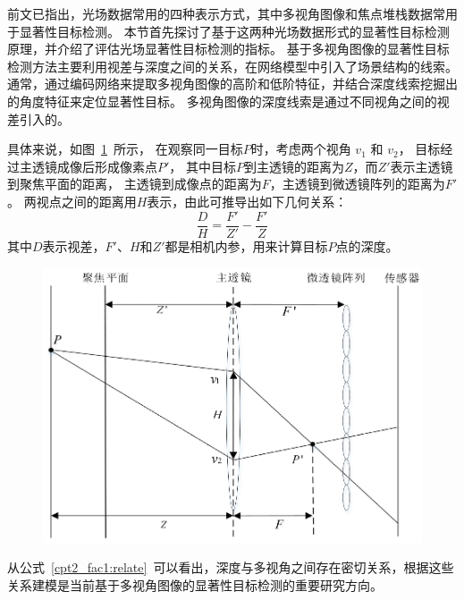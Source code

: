 %
%
%
%
%
%
%
%
%
%
%
%
前文已指出，光场数据常用的四种表示方式，其中多视角图像和焦点堆栈数据常用于显著性目标检测。
本节首先探讨了基于这两种光场数据形式的显著性目标检测原理，并介绍了评估光场显著性目标检测的指标。
%
%
%
%
%
%
基于多视角图像的显著性目标检测方法主要利用视差与深度之间的关系，在网络模型中引入了场景结构的线索。
通常，通过编码网络来提取多视角图像的高阶和低阶特征，并结合深度线索挖掘出的角度特征来定位显著性目标。
多视角图像的深度线索是通过不同视角之间的视差引入的。

具体来说，如图~\ref{cpt2_fig8:multi_array}~所示，
在观察同一目标$P$时，考虑两个视角 $v_{1}$ 和 $v_{2}$，
目标经过主透镜成像后形成像素点$P'$，
其中目标$P$到主透镜的距离为$Z$，而$Z'$表示主透镜到聚焦平面的距离，
主透镜到成像点的距离为$F$，主透镜到微透镜阵列的距离为$F'$。
两视点之间的距离用$H$表示，由此可推导出如下几何关系：
%
%
\begin{equation}
	\frac{D}{H} = \frac{F'}{Z'} - \frac{F'}{Z} 
	\label{cpt2_fac1:relate}
\end{equation}
%
%
其中$D$表示视差，$F'$、$H$和$Z'$都是相机内参，用来计算目标$P$点的深度。\par
%
%
\begin{figure}[!ht]
	\centering
	\includegraphics[width=0.80\linewidth]{figures/chapter2/multi_array}
	\label{cpt2_fig8:multi_array}
\end{figure}
%
%
%
%
从公式~\ref{cpt2_fac1:relate}~可以看出，深度与多视角之间存在密切关系，根据这些关系建模是当前基于多视角图像的显著性目标检测的重要研究方向。

